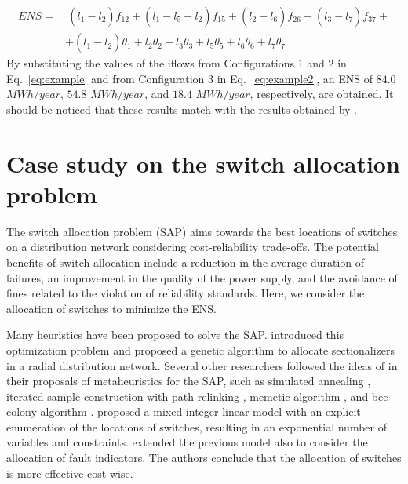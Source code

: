 \begin{align} 
	\displaystyle ENS =& \ (\tilde{l}_1-\tilde{l}_2)f_{12} + (\tilde{l}_1-\tilde{l}_5-\tilde{l}_2)f_{15} + (\tilde{l}_2-\tilde{l}_6)f_{26} + (\tilde{l}_3-\tilde{l}_7)f_{37} + \nonumber \\
	&+ (\tilde{l}_1-\tilde{l}_2)\theta_1 + \tilde{l}_2\theta_2 + \tilde{l}_3\theta_3 +  \tilde{l}_5\theta_5 + \tilde{l}_6\theta_6	+ \tilde{l}_7\theta_7
	\label{eq:example2}
\end{align}	
By substituting the values of the iflows from Configurations 1 and 2 in Eq.~\eqref{eq:example} and from Configuration 3 in Eq.~\eqref{eq:example2}, an ENS of $84.0$ $MWh/year$, $54.8$ $MWh/year$, and $18.4$ $MWh/year$, respectively, are obtained. It should be noticed that these results match with the results obtained by \cite{billinton}.



\section{Case study on the switch allocation problem} \label{sec:Optimization}

The switch allocation problem (SAP) aims towards the best  locations of switches on a distribution network considering  cost-reliability trade-offs. The potential benefits of switch allocation include a reduction in the average duration of failures, an improvement in the quality of the power supply, and the avoidance of fines related to the violation of reliability standards.
Here, we consider the allocation of switches to minimize the ENS. 

Many heuristics have been proposed to solve the SAP. \cite{levitin1994} introduced this optimization problem and proposed a genetic algorithm to allocate sectionalizers in a radial distribution network. 
Several other researchers followed the ideas of \cite{levitin1994} in their proposals of metaheuristics for the SAP, such as simulated annealing \cite{billinton2}, iterated sample construction with path relinking \cite{Benavides2013}, memetic algorithm \cite{assis2014}, and bee colony algorithm 
\cite{AmanEtal2016}.
\cite{JahromiEtal2012} proposed a mixed-integer linear model with an explicit enumeration of the locations of switches, resulting in an exponential number of variables and constraints.
\cite{FarajollahiFotuhiSafdarian2019} extended the previous model also to consider the allocation of fault indicators. The authors conclude that the allocation of switches is more  effective cost-wise.


